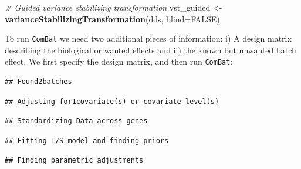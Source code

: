 \documentclass[9pt,a4paper,]{extarticle}
\newenvironment{Shaded}{\begin{snugshade}}{\end{snugshade}}
\newcommand{\KeywordTok}[1]{\textcolor[rgb]{0.13,0.29,0.53}{\textbf{{#1}}}}
\newcommand{\DataTypeTok}[1]{\textcolor[rgb]{0.13,0.29,0.53}{{#1}}}
\newcommand{\StringTok}[1]{\textcolor[rgb]{0.31,0.60,0.02}{{#1}}}
\newcommand{\CommentTok}[1]{\textcolor[rgb]{0.56,0.35,0.01}{\textit{{#1}}}}
\newcommand{\OtherTok}[1]{\textcolor[rgb]{0.56,0.35,0.01}{{#1}}}
\newcommand{\NormalTok}[1]{{#1}}
\begin{document}
\begin{Shaded}
\begin{Highlighting}[]
\CommentTok{# Guided variance stabilizing transformation}
\NormalTok{vst_guided <-}\StringTok{ }\KeywordTok{varianceStabilizingTransformation}\NormalTok{(dds, }\DataTypeTok{blind=}\OtherTok{FALSE}\NormalTok{)}
\end{Highlighting}
\end{Shaded}

To run \texttt{ComBat} we need two additional pieces of information: i) A design matrix describing the biological or wanted effects and ii) the known but unwanted batch effect. We first specify the design matrix, and then run \texttt{ComBat}:

\begin{Shaded}
\end{Shaded}

\begin{verbatim}
## Found2batches
\end{verbatim}

\begin{verbatim}
## Adjusting for1covariate(s) or covariate level(s)
\end{verbatim}

\begin{verbatim}
## Standardizing Data across genes
\end{verbatim}

\begin{verbatim}
## Fitting L/S model and finding priors
\end{verbatim}

\begin{verbatim}
## Finding parametric adjustments
\end{verbatim}
\end{document}
